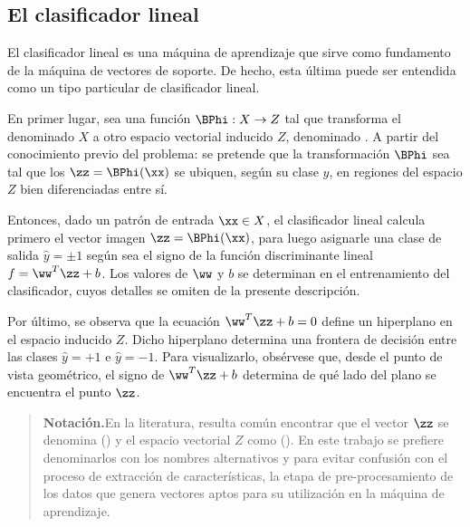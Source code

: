 %
%
\subsection{El clasificador lineal}
%
El clasificador lineal es una máquina de aprendizaje \cite{nilsson}
que sirve como fundamento de la máquina de vectores de soporte. De
hecho, esta última puede ser entendida como un tipo particular de
clasificador lineal.

En primer lugar, sea una función $\BPhi:X\rightarrow{}Z$ tal que
transforma el denominado  $X$ a otro espacio
vectorial inducido $Z$, denominado .  A partir del
conocimiento previo del problema: se pretende que la transformación
$\BPhi$ sea tal que los  $\zz=\BPhi(\xx)$ se
ubiquen, según su clase $y$, en regiones del espacio $Z$ bien
diferenciadas entre sí.

Entonces, dado un patrón de entrada $\xx\in{}X$, el clasificador
lineal calcula primero el vector imagen $\zz=\BPhi(\xx)$, para luego
asignarle una clase de salida $\hat{y}=\pm{}1$ según sea el signo de
la función discriminante lineal $f=\ww^T\zz+b$.  Los valores de $\ww$
y $b$ se determinan en el entrenamiento del clasificador, cuyos detalles
se omiten de la presente descripción.

Por último, se observa que la ecuación $\ww^T\zz+b=0$ define un
hiperplano en el espacio inducido $Z$. Dicho hiperplano determina una
frontera de decisión entre las clases $\hat{y}=+1$ e
$\hat{y}=-1$. Para visualizarlo, obsérvese que, desde el punto de
vista geométrico, el signo de $\ww^T\zz+b$ determina de qué lado del
plano se encuentra el punto $\zz$.

%
\begin{quote}
  {\bfseries Notación.}\quad{}En la literatura, resulta común
  encontrar que el vector $\zz$ se denomina  () y el espacio vectorial $Z$
  como  ().  En
  este trabajo se prefiere denominarlos con los nombres alternativos
   y  para evitar
  confusión con el proceso de extracción de características, la etapa
  de pre-procesamiento de los datos que genera vectores aptos para su
  utilización en la máquina de aprendizaje.
\end{quote}
%
